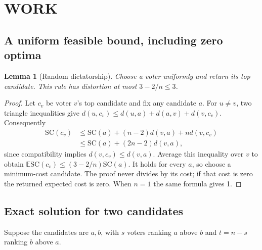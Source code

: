 \documentclass[11pt,a4paper]{article}
\newcommand{\E}{\mathbb E}
\newtheorem{lemma}[theorem]{Lemma}
\theoremstyle{definition}
\theoremstyle{remark}
\begin{document}
\section{WORK}
\subsection{A uniform feasible bound, including zero optima}
\begin{lemma}[Random dictatorship]
Choose a voter uniformly and return its top candidate. This rule has distortion at most $3-2/n\leq3$.
\end{lemma}
\begin{proof}
Let $c_v$ be voter $v$'s top candidate and fix any candidate $a$. For $u\ne v$, two triangle inequalities give
$d(u,c_v)\leq d(u,a)+d(a,v)+d(v,c_v)$. Consequently
\begin{align*}
 \mathrm{SC}(c_v)
 &\leq\mathrm{SC}(a)+(n-2)d(v,a)+n d(v,c_v)\\
 &\leq\mathrm{SC}(a)+(2n-2)d(v,a),
\end{align*}
since compatibility implies $d(v,c_v)\leq d(v,a)$. Average this inequality over $v$ to obtain
$\E\mathrm{SC}(c_v)\leq(3-2/n)\mathrm{SC}(a)$.
It holds for every $a$, so choose a minimum-cost candidate. The proof never divides by its cost; if that cost is zero the returned expected cost is zero. When $n=1$ the same formula gives 1.
\end{proof}

\subsection{Exact solution for two candidates}
Suppose the candidates are $a,b$, with $s$ voters ranking $a$ above $b$ and $t=n-s$ ranking $b$ above $a$.
\end{document}
